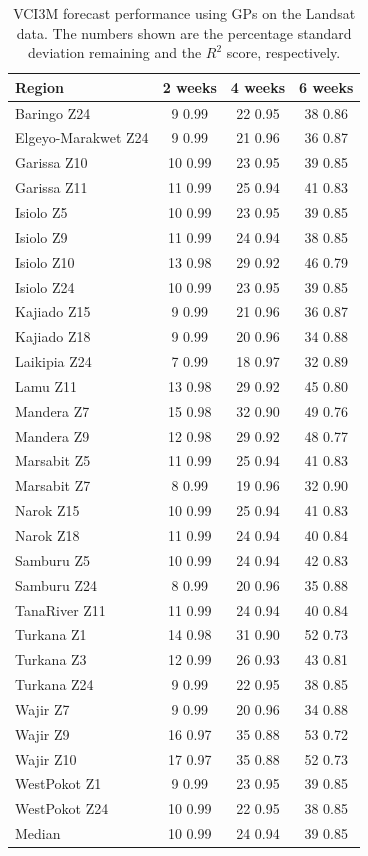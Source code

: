 \documentclass[review]{elsarticle}
\begin{document}
\begin{table}
	\footnotesize
	\caption{VCI3M forecast performance using GPs on the Landsat data. The numbers shown are the percentage standard deviation remaining and the $R^2$ score, respectively.} \label{tab:VCI_LS}
	\centering
	\begin{tabular}{l|ccc} 
		\toprule
		\textbf{Region}  &  \textbf{2 weeks} &  \textbf{4 weeks}  & \textbf{6 weeks}  \\
		\midrule
		Baringo Z24 & 9 0.99 & 22 0.95 & 38 0.86 \\
		Elgeyo-Marakwet Z24 & 9 0.99 & 21 0.96 & 36 0.87 \\
		Garissa Z10 & 10 0.99 & 23 0.95 & 39 0.85 \\
		Garissa Z11 & 11 0.99 & 25 0.94 & 41 0.83 \\
		Isiolo Z5 & 10 0.99 & 23 0.95 & 39 0.85 \\
		Isiolo Z9 & 11 0.99 & 24 0.94 & 38 0.85 \\
		Isiolo Z10 & 13 0.98 & 29 0.92 & 46 0.79 \\
		Isiolo Z24 & 10 0.99 & 23 0.95 & 39 0.85 \\
		Kajiado Z15 & 9 0.99 & 21 0.96 & 36 0.87 \\
		Kajiado Z18 & 9 0.99 & 20 0.96 & 34 0.88 \\
		Laikipia Z24 & 7 0.99 & 18 0.97 & 32 0.89 \\
		Lamu Z11 & 13 0.98 & 29 0.92 & 45 0.80 \\
		Mandera Z7 & 15 0.98 & 32 0.90 & 49 0.76 \\
		Mandera Z9 & 12 0.98 & 29 0.92 & 48 0.77 \\
		Marsabit Z5 & 11 0.99 & 25 0.94 & 41 0.83 \\
		Marsabit Z7 & 8 0.99 & 19 0.96 & 32 0.90 \\
		Narok Z15 & 10 0.99 & 25 0.94 & 41 0.83 \\
		Narok Z18 & 11 0.99 & 24 0.94 & 40 0.84 \\
		Samburu Z5 & 10 0.99 & 24 0.94 & 42 0.83 \\
		Samburu Z24 & 8 0.99 & 20 0.96 & 35 0.88 \\
		TanaRiver Z11 & 11 0.99 & 24 0.94 & 40 0.84 \\
		Turkana Z1 & 14 0.98 & 31 0.90 & 52 0.73 \\
		Turkana Z3 & 12 0.99 & 26 0.93 & 43 0.81 \\
		Turkana Z24 & 9 0.99 & 22 0.95 & 38 0.85 \\
		Wajir Z7 & 9 0.99 & 20 0.96 & 34 0.88 \\
		Wajir Z9 & 16 0.97 & 35 0.88 & 53 0.72 \\
		Wajir Z10 & 17 0.97 & 35 0.88 & 52 0.73 \\
		WestPokot Z1 & 9 0.99 & 23 0.95 & 39 0.85 \\
		WestPokot Z24 & 10 0.99 & 22 0.95 & 38 0.85 \\
		\bottomrule
		Median & 10 0.99 & 24 0.94 & 39 0.85 \\
		\bottomrule
	\end{tabular}
\end{table}
\end{document}
